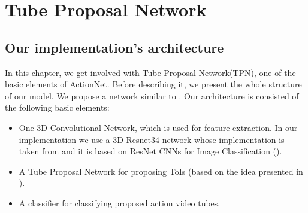 


% 

\chapter{Tube Proposal Network}

\section{ Our implementation's architecture}
In this chapter, we get involved with Tube Proposal Network(TPN), one of the basic elements of ActionNet. Before describing it, we present
the whole structure of our model. We propose a network similar to \cite{DBLP:journals/corr/HouCS17}.
Our architecture is consisted of the following basic elements:
\begin{itemize}
\item One 3D Convolutional Network, which is used for feature extraction. In our implementation we use a 3D Resnet34 network whose implementation  is taken from   \cite{hara3dcnns} and it is based on ResNet CNNs for Image Classification (\cite{DBLP:journals/corr/HeZRS15}).
\item A Tube Proposal Network for proposing ToIs (based on the idea presented in \cite{DBLP:journals/corr/HouCS17}).
\item A classifier for classifying proposed action video tubes.
\end{itemize}

